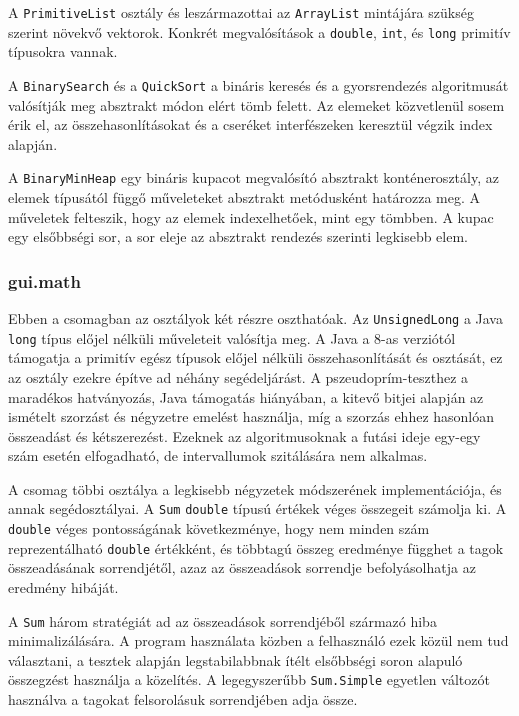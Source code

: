 A \texttt{PrimitiveList} osztály és leszármazottai az \texttt{ArrayList} mintájára szükség szerint növekvő vektorok. Konkrét megvalósítások a \texttt{double}, \texttt{int}, és \texttt{long} primitív típusokra vannak.

A \texttt{BinarySearch} és a \texttt{QuickSort} a bináris keresés és a gyorsrendezés algoritmusát valósítják meg absztrakt módon elért tömb felett.
Az elemeket közvetlenül sosem érik el, az összehasonlításokat és a cseréket interfészeken keresztül végzik index alapján.

A \texttt{BinaryMinHeap} egy bináris kupacot megvalósító absztrakt konténerosztály, az elemek típusától függő műveleteket absztrakt metódusként határozza meg.
A műveletek felteszik, hogy az elemek indexelhetőek, mint egy tömbben.
A kupac egy elsőbbségi sor, a sor eleje az absztrakt rendezés szerinti legkisebb elem.

\subsubsection{gui.math}

Ebben a csomagban az osztályok két részre oszthatóak.
Az \texttt{UnsignedLong} a Java \texttt{long} típus előjel nélküli műveleteit valósítja meg.
A Java a 8-as verziótól támogatja a primitív egész típusok előjel nélküli összehasonlítását és osztását, ez az osztály ezekre építve ad néhány segédeljárást.
A pszeudoprím-teszthez a maradékos hatványozás, Java támogatás hiányában, a kitevő bitjei alapján az ismételt szorzást és négyzetre emelést használja, míg a szorzás ehhez hasonlóan összeadást és kétszerezést.
Ezeknek az algoritmusoknak a futási ideje egy-egy szám esetén elfogadható, de intervallumok szitálására nem alkalmas.

A csomag többi osztálya a legkisebb négyzetek módszerének implementációja, és annak segédosztályai.
A \texttt{Sum} \texttt{double} típusú értékek véges összegeit számolja ki.
A \texttt{double} véges pontosságának következménye, hogy nem minden szám reprezentálható \texttt{double} értékként, és többtagú összeg eredménye függhet a tagok összeadásának sorrendjétől, azaz az összeadások sorrendje befolyásolhatja az eredmény hibáját.

A \texttt{Sum} három stratégiát ad az összeadások sorrendjéből származó hiba minimalizálására.
A program használata közben a felhasználó ezek közül nem tud választani, a tesztek alapján legstabilabbnak ítélt elsőbbségi soron alapuló összegzést használja a közelítés.
A legegyszerűbb \texttt{Sum.Simple} egyetlen változót használva a tagokat felsorolásuk sorrendjében adja össze.

